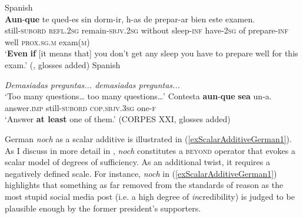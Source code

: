 {\begin{exe}
	\ex Spanish\label{exScalarAdditiveAunque}\\
	\gll \textbf{Aun}-\textbf{que} te qued-es sin dorm-ir, h-as de prepar-ar bien este examen.\\
	still-\textsc{subord} \textsc{refl}.2\textsc{sg} remain-\textsc{sbjv}.2\textsc{sg} without sleep-\textsc{inf} have-2\textsc{sg} of prepare-\textsc{inf} well \textsc{prox}.\textsc{sg}.\textsc{m} exam(\textsc{m})\\
	\glt \lq \textbf{Even} \textbf{if} [it means that] you don't get any sleep you have to prepare well for this exam.' (\cite[§47.12e]{RAEGramatica}, glosses added)
	\ex Spanish \label{exScalarAdditiveAunqueSea1}
	\begin{xlist}
		 \textit{Demasiadas preguntas... demasiadas preguntas...}
		\\ \lq Too many questions… too many questions…\rq{}
		 \gll Contesta \textbf{aun}-\textbf{que} \textbf{sea} un-a.\\
		answer.\textsc{imp} still-\textsc{subord} \textsc{cop}.\textsc{sbjv}.3\textsc{sg} one-\textsc{f}\\
		\glt \lq Answer \textbf{at least} one of them.\rq{ }(CORPES XXI, glosses added)
	\end{xlist} 
\end{exe}

German \textit{noch} as a scalar additive is illustrated in (\ref{exScalarAdditiveGerman1}). As I discuss in more detail in \textcite{PersohnSchonNoch}, \textit{noch} constitutes a \textsc{beyond} operator that evokes a scalar model of degrees of sufficiency. As an additional twist, it requires a negatively defined scale. For instance, \textit{noch} in (\ref{exScalarAdditiveGerman1}) highlights that something as far removed from the standards of reason as the most stupid social media post (i.e. a high degree of \textit{in}credibility) is judged to be plausible enough by the former president's supporters.

}
